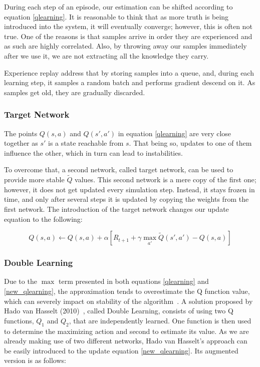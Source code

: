 \documentclass[11pt,twoside]{article}
\begin{document}
During each step of an episode, our estimation can be shifted according to equation \ref{qlearning}. It is reasonable to think that as more truth is being introduced into the system, it will eventually converge; however, this is often not true. One of the reasons is that samples arrive in order they are experienced and as such are highly correlated. Also, by throwing away our samples immediately after we use it, we are not extracting all the knowledge they carry.

Experience replay address that by storing samples into a queue, and, during each learning step, it samples a random batch and performs gradient descend on it. As samples get old, they are gradually discarded.

\subsubsection{Target Network}

The points $Q(s, a)$ and $Q(s', a')$ in equation \ref{qlearning} are very close together as $s'$ is a state reachable from $s$. That being so, updates to one of them influence the other, which in turn can lead to instabilities.

To overcome that, a second network, called target network, can be used to provide more stable $\widetilde{Q}$ values. This second network is a mere copy of the first one; however, it does not get updated every simulation step. Instead, it stays frozen in time, and only after several steps it is updated by copying the weights from the first network. The introduction of the target network changes our update equation to the following:

\begin{equation} \label{new_qlearning}
	Q(s, a) \leftarrow Q(s, a) + \alpha [R_{t+1} + \gamma \max_{a'}\widetilde{Q}(s', a') - Q(s,a)]
\end{equation}


\subsubsection{Double Learning}\label{double_learning}

Due to the $\max$ term presented in both equations \ref{qlearning} and \ref{new_qlearning}, the approximation tends to overestimate the Q function value, which can severely impact on stability of the algorithm~\cite{overestimation}. A solution proposed by Hado van Hasselt (2010)~\cite{doubleq2010}, called Double Learning, consists of using two Q functions, $Q_1$ and $Q_2$, that are independently learned. One function is then used to determine the maximizing action and second to estimate its value. As we are already making use of two different networks, Hado van Hasselt's approach can be easily introduced to the update equation \ref{new_qlearning}. Its augmented version is as follows:
\end{document}
